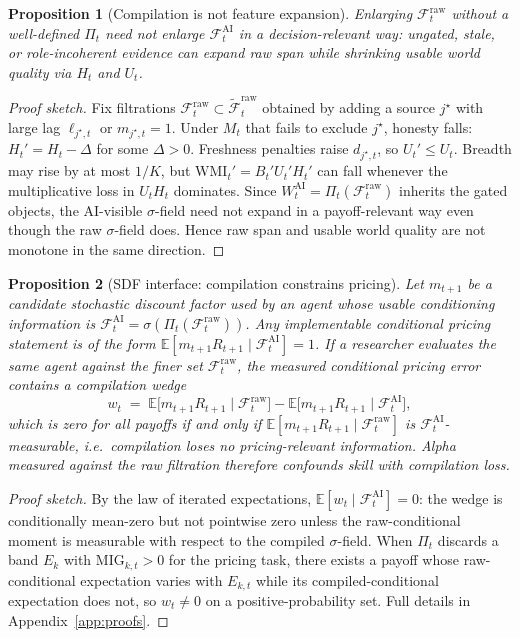 \documentclass[12pt]{article}
\newtheorem{proposition}{Proposition}
\begin{document}
\begin{proposition}[Compilation is not feature expansion]
\label{prop:compile}
Enlarging $\mathcal{F}^{\mathrm{raw}}_t$ without a well-defined $\Pi_t$ need not enlarge $\mathcal{F}^{\mathrm{AI}}_t$ in a decision-relevant way: ungated, stale, or role-incoherent evidence can expand raw span while shrinking usable world quality via $H_t$ and $U_t$.
\end{proposition}
\begin{proof}[Proof sketch]
Fix filtrations $\mathcal{F}^{\mathrm{raw}}_t\subset\widetilde{\mathcal{F}}^{\mathrm{raw}}_t$ obtained by adding a source $j^\star$ with large lag $\ell_{j^\star,t}$ or $m_{j^\star,t}=1$. Under $M_t$ that fails to exclude $j^\star$, honesty falls: $H_t'=H_t-\Delta$ for some $\Delta>0$. Freshness penalties raise $d_{j^\star,t}$, so $U_t'\le U_t$. Breadth may rise by at most $1/K$, but $\mathrm{WMI}_t'=B_t'U_t'H_t'$ can fall whenever the multiplicative loss in $U_tH_t$ dominates. Since $W^{\mathrm{AI}}_t=\Pi_t(\mathcal{F}^{\mathrm{raw}}_t)$ inherits the gated objects, the AI-visible $\sigma$-field need not expand in a payoff-relevant way even though the raw $\sigma$-field does. Hence raw span and usable world quality are not monotone in the same direction.
\end{proof}

\begin{proposition}[SDF interface: compilation constrains pricing]
\label{prop:sdf}
Let $m_{t+1}$ be a candidate stochastic discount factor used by an agent whose usable conditioning information is $\mathcal{F}^{\mathrm{AI}}_t=\sigma(\Pi_t(\mathcal{F}^{\mathrm{raw}}_t))$. Any implementable conditional pricing statement is of the form
$\mathbb{E}[m_{t+1}R_{t+1}\mid\mathcal{F}^{\mathrm{AI}}_t]=1$.
If a researcher evaluates the same agent against the finer set $\mathcal{F}^{\mathrm{raw}}_t$, the measured conditional pricing error contains a \emph{compilation wedge}
\[
w_t \;=\; \mathbb{E}\bigl[m_{t+1}R_{t+1}\mid\mathcal{F}^{\mathrm{raw}}_t\bigr]-\mathbb{E}\bigl[m_{t+1}R_{t+1}\mid\mathcal{F}^{\mathrm{AI}}_t\bigr],
\]
which is zero for all payoffs if and only if $\mathbb{E}[m_{t+1}R_{t+1}\mid\mathcal{F}^{\mathrm{raw}}_t]$ is $\mathcal{F}^{\mathrm{AI}}_t$-measurable, i.e.\ compilation loses no pricing-relevant information. Alpha measured against the raw filtration therefore confounds skill with compilation loss.
\end{proposition}
\begin{proof}[Proof sketch]
By the law of iterated expectations, $\mathbb{E}[w_t\mid\mathcal{F}^{\mathrm{AI}}_t]=0$: the wedge is conditionally mean-zero but not pointwise zero unless the raw-conditional moment is measurable with respect to the compiled $\sigma$-field. When $\Pi_t$ discards a band $E_k$ with $\mathrm{MIG}_{k,t}>0$ for the pricing task, there exists a payoff whose raw-conditional expectation varies with $E_{k,t}$ while its compiled-conditional expectation does not, so $w_t\neq 0$ on a positive-probability set. Full details in Appendix~\ref{app:proofs}.
\end{proof}
\end{document}
